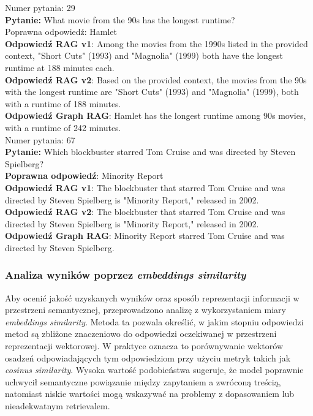 \documentclass[
a4paper,
12pt,
]{article}
\begin{document}
\noindent{}Numer pytania: 29\\
\textbf{Pytanie:} What movie from the 90s has the longest runtime?\\
Poprawna odpowiedź: Hamlet\\
\textbf{Odpowiedź RAG v1}: Among the movies from the 1990s listed in the provided context, "Short Cuts" (1993) and "Magnolia" (1999) both have the longest runtime at 188 minutes each.\\
\textbf{Odpowiedź RAG v2}: Based on the provided context, the movies from the 90s with the longest runtime are "Short Cuts" (1993) and "Magnolia" (1999), both with a runtime of 188 minutes.\\
\textbf{Odpowiedź Graph RAG}: Hamlet has the longest runtime among 90s movies, with a runtime of 242 minutes.\\

\noindent{}Numer pytania: 67\\
\textbf{Pytanie:} Which blockbuster starred Tom Cruise and was directed by Steven Spielberg?\\
\textbf{Poprawna odpowiedź}: Minority Report\\
\textbf{Odpowiedź RAG v1}: The blockbuster that starred Tom Cruise and was directed by Steven Spielberg is "Minority Report," released in 2002.\\
\textbf{Odpowiedź RAG v2}: The blockbuster that starred Tom Cruise and was directed by Steven Spielberg is "Minority Report," released in 2002.\\
\textbf{Odpowiedź Graph RAG}: Minority Report starred Tom Cruise and was directed by Steven Spielberg.\\


\subsubsection{Analiza wyników poprzez \textit{embeddings similarity}}

Aby ocenić jakość uzyskanych wyników oraz sposób reprezentacji informacji w przestrzeni semantycznej, przeprowadzono analizę z wykorzystaniem miary \textit{embeddings similarity}. Metoda ta pozwala określić, w jakim stopniu odpowiedzi metod są zbliżone znaczeniowo do odpowiedzi oczekiwanej w przestrzeni reprezentacji wektorowej.
% 
W praktyce oznacza to porównywanie wektorów osadzeń odpowiadających tym odpowiedziom przy użyciu metryk takich jak \textit{cosinus similarity}. Wysoka wartość podobieństwa sugeruje, że model poprawnie uchwycił semantyczne powiązanie między zapytaniem a zwróconą treścią, natomiast niskie wartości mogą wskazywać na problemy z dopasowaniem lub nieadekwatnym retrievalem.
\end{document}
